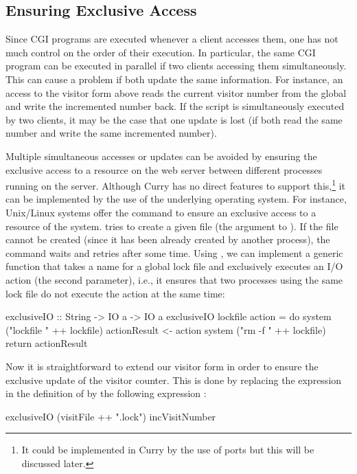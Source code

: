 \subsection{Ensuring Exclusive Access}
\label{sec-exclusiveIO}

Since CGI programs are executed whenever a client accesses them,
one has not much control on the order of their execution.
In particular, the same CGI program can be executed
in parallel if two clients accessing them simultaneously.
This can cause a problem if both update the same information.
For instance, an access to the visitor form above
reads the current visitor number from the global 
and write the incremented number back.
If the script is simultaneously executed by two clients,
it may be the case that one update is lost (if both read the same
number and write the same incremented number).

Multiple simultaneous accesses or updates can be avoided
by ensuring the exclusive access to a resource on the web server
between different processes running on the server.
Although Curry has no direct features to support this,\footnote{%
It could be implemented in Curry by the use of ports but this
will be discussed later.}
it can be implemented by the use of the underlying
operating system. For instance, Unix/Linux systems
offer the command  to ensure
an exclusive access to a resource of the system.
 tries to create
a given file (the argument to ).
If the file cannot be created (since it has been already created
by another process), the  command waits
and retries after some time.
Using , we can implement a generic function
 that takes a name for a global lock file
and exclusively executes an I/O action (the second parameter),
i.e., it ensures that two processes using the same lock file
do not execute the action at the same time:
%
\begin{curry}
exclusiveIO :: String -> IO a -> IO a
exclusiveIO lockfile action = do
  system ("lockfile " ++ lockfile)
  actionResult <- action
  system ("rm -f " ++ lockfile)
  return actionResult
\end{curry}
%
Now it is straightforward to extend our visitor form
in order to ensure the exclusive update of the visitor counter.
This is done by replacing the expression 
in the definition of  by the following
expression :
%
\begin{curry}
exclusiveIO (visitFile ++ ".lock") incVisitNumber
\end{curry}


